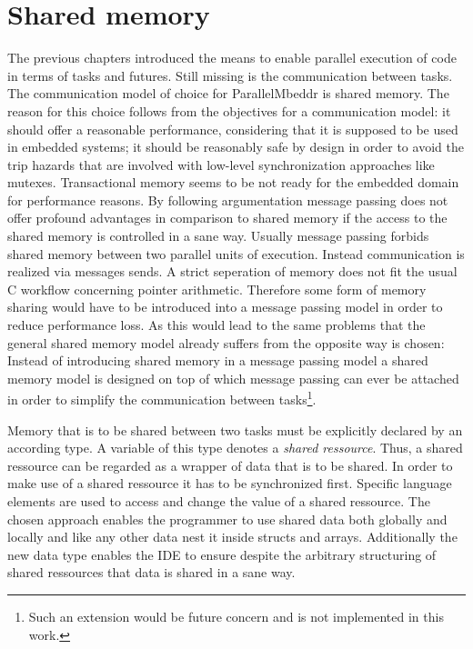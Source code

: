 \section{Shared memory}
\label{sharedMemory}
The previous chapters introduced the means to enable parallel execution of code in terms of tasks and futures. Still missing is the communication between tasks. The communication model of choice for ParallelMbeddr is shared memory. The reason for this choice follows from the objectives for a communication model: it should offer a reasonable performance, considering that it is supposed to be used in embedded systems; it should be reasonably safe by design in order to avoid the trip hazards that are involved with low-level synchronization approaches like mutexes. Transactional memory seems to be not ready for the embedded domain for performance reasons. By following argumentation message passing does not offer profound advantages in comparison to shared memory if the access to the shared memory is controlled in a sane way. Usually message passing forbids shared memory between two parallel units of execution. Instead communication is realized via messages sends. A strict seperation of memory does not fit the usual C workflow concerning pointer arithmetic. Therefore some form of memory sharing would have to be introduced into a message passing model in order to reduce performance loss. As this would lead to the same problems that the general shared memory model already suffers from the opposite way is chosen: Instead of introducing shared memory in a message passing model a shared memory model is designed on top of which message passing can ever be attached in order to simplify the communication between tasks\footnote{Such an extension would be future concern and is not implemented in this work.}.

Memory that is to be shared between two tasks must be explicitly declared by an according type. A variable of this type denotes a \textit{shared ressource}. Thus, a shared ressource can be regarded as a wrapper of data that is to be shared. In order to make use of a shared ressource it has to be synchronized first. Specific language elements are used to access and change the value of a shared ressource. The chosen approach enables the programmer to use shared data both globally and locally and like any other data nest it inside structs and arrays. Additionally the new data type enables the IDE to ensure despite the arbitrary structuring of shared ressources that data is shared in a sane way.

